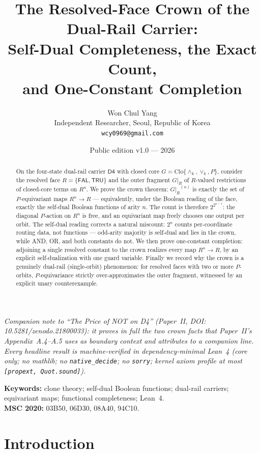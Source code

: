 \documentclass[11pt]{article}
\title{The Resolved-Face Crown of the Dual-Rail Carrier:\\
Self-Dual Completeness, the Exact Count,\\ and One-Constant Completion}
\author{Won Chul Yang\\ \small Independent Researcher, Seoul, Republic of Korea\\
\small \texttt{wcy0969@gmail.com}}
\date{Public edition v1.0 --- 2026}
\theoremstyle{remark}
\newcommand{\Dfour}{\ensuremath{\mathsf{D4}}}
\newcommand{\FAL}{\ensuremath{\mathsf{FAL}}}
\newcommand{\TRU}{\ensuremath{\mathsf{TRU}}}
\newcommand{\meetk}{\ensuremath{\wedge_k}}
\newcommand{\joink}{\ensuremath{\vee_k}}
\newcommand{\Clo}{\ensuremath{\mathrm{Clo}}}
\newcommand{\GR}{\ensuremath{G|_R}}
\begin{document}
\maketitle

\begin{center}\small\itshape
Companion note to ``The Price of NOT on \textsf{D4}'' (Paper~II,
DOI: 10.5281/zenodo.21800033): it proves in full the two crown facts that
Paper~II's Appendix~A.4--A.5 uses as boundary context and attributes to a
companion line. Every headline result is machine-verified in
dependency-minimal Lean~4 (core only; no mathlib; no
\texttt{native\_decide}; no \texttt{sorry}; kernel axiom profile at most
\texttt{[propext, Quot.sound]}).
\end{center}

\begin{abstract}
On the four-state dual-rail carrier \Dfour{} with closed core
$G=\Clo\{\meetk,\joink,P\}$, consider the resolved face $R=\{\FAL,\TRU\}$
and the outer fragment $\GR$ of $R$-valued restrictions of closed-core
terms on $R^n$. We prove the crown theorem: $\GR^{(n)}$ is exactly the
set of $P$-equivariant maps $R^n\to R$ --- equivalently, under the Boolean
reading of the face, exactly the self-dual Boolean functions of arity
$n$. The count is therefore $2^{2^{n-1}}$: the diagonal $P$-action on
$R^n$ is free, and an equivariant map freely chooses one output per
orbit. The self-dual reading corrects a natural miscount: $2^n$ counts
per-coordinate routing data, not functions --- odd-arity majority is
self-dual and lies in the crown, while AND, OR, and both constants do
not. We then prove one-constant completion: adjoining a single resolved
constant to the crown realizes every map $R^n\to R$, by an explicit
self-dualization with one guard variable. Finally we record why the crown
is a genuinely dual-rail (single-orbit) phenomenon: for resolved faces
with two or more $P$-orbits, $P$-equivariance strictly over-approximates
the outer fragment, witnessed by an explicit unary counterexample.
\end{abstract}

\noindent\textbf{Keywords:} clone theory; self-dual Boolean functions;
dual-rail carriers; equivariant maps; functional completeness; Lean~4.\\
\textbf{MSC 2020:} 03B50, 06D30, 08A40, 94C10.

\section{Introduction}
\end{document}
